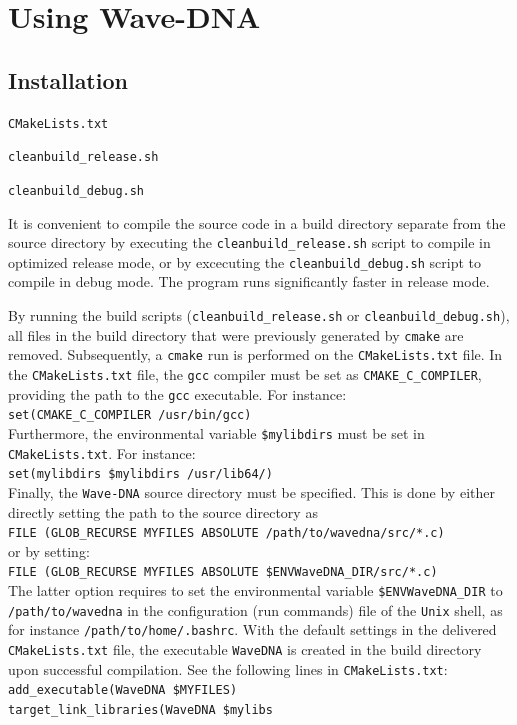 \chapter{Using Wave-DNA}
\label{chap:Using Wave-DNA}



\section{Installation}
\label{sec:Installation}

\begin{compactitem}
\item {\tt CMakeLists.txt}
\item {\tt cleanbuild\_release.sh}
\item {\tt cleanbuild\_debug.sh}
\end{compactitem}
It is convenient to compile the source code in a build directory separate from the source directory by executing the {\tt cleanbuild\_release.sh} script to compile in optimized release mode, or by excecuting the {\tt cleanbuild\_debug.sh} script to compile in debug mode. The program runs significantly faster in release mode.

By running the build scripts ({\tt cleanbuild\_release.sh} or {\tt cleanbuild\_debug.sh}), all files in the build directory that were previously generated by {\tt cmake} are removed. Subsequently, a {\tt cmake} run is performed on the {\tt CMakeLists.txt} file. In the {\tt CMakeLists.txt} file, the {\tt gcc} compiler must be set as {\tt CMAKE\_C\_COMPILER}, providing the path to the {\tt gcc} executable. For instance:
\\[8pt]
{\tt set(CMAKE\_C\_COMPILER /usr/bin/gcc)}
\\[8pt]
Furthermore, the environmental variable  {\tt \${mylibdirs}} must be set in {\tt CMakeLists.txt}. For instance:
\\[8pt]
{\tt set(mylibdirs \${mylibdirs} /usr/lib64/)}
\\[8pt]
Finally, the {\tt Wave-DNA} source directory must be specified. This is done by either directly setting the path to the source directory as
\\[8pt]
{\tt FILE (GLOB\_RECURSE MYFILES ABSOLUTE  /path/to/wavedna/src/*.c)}
\\[8pt]
or by setting:
\\[8pt]
{\tt FILE (GLOB\_RECURSE MYFILES ABSOLUTE  \$ENV{WaveDNA\_DIR}/src/*.c)}
\\[8pt]
The latter option requires to set the environmental variable {\tt \$ENV{WaveDNA\_DIR}} to {\tt /path/to/wavedna} in the configuration (run commands) file of the {\tt Unix} shell, as for instance {\tt /path/to/home/.bashrc}. With the default settings in the delivered {\tt CMakeLists.txt} file, the executable {\tt WaveDNA} is created in the build directory upon successful compilation. See the following lines in {\tt CMakeLists.txt}:
\\[8pt]
{\tt add\_executable(WaveDNA \${MYFILES})} \\
{\tt target\_link\_libraries(WaveDNA \${mylibs}}
\\[8pt]


